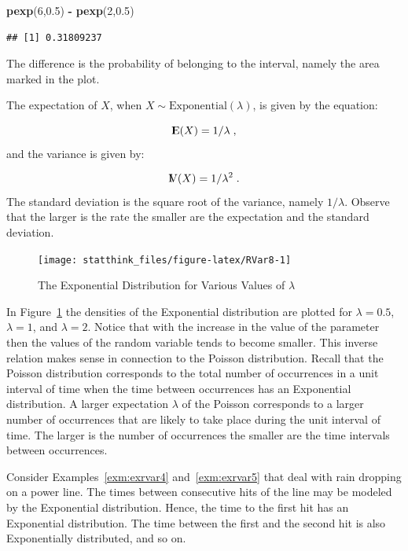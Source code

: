 \documentclass[]{krantz}
\makeatletter
\newenvironment{Shaded}{\begin{snugshade}}{\end{snugshade}}
\newcommand{\DecValTok}[1]{\textcolor[rgb]{0.00,0.00,0.81}{#1}}
\newcommand{\FloatTok}[1]{\textcolor[rgb]{0.00,0.00,0.81}{#1}}
\newcommand{\KeywordTok}[1]{\textcolor[rgb]{0.13,0.29,0.53}{\textbf{#1}}}
\newcommand{\NormalTok}[1]{#1}
\newcommand{\OperatorTok}[1]{\textcolor[rgb]{0.81,0.36,0.00}{\textbf{#1}}}
\newcommand{\StringTok}[1]{\textcolor[rgb]{0.31,0.60,0.02}{#1}}
\newcommand{\Expec}{{\rm I\kern-.3em E}}
\newcommand{\Var}{{\rm I\kern-.3em V}}
\newenvironment{kframe}{%
\medskip{}
\setlength{\fboxsep}{.8em}
 \def\at@end@of@kframe{}%
 \ifinner\ifhmode%
  \def\at@end@of@kframe{\end{minipage}}%
  \begin{minipage}{\columnwidth}%
 \fi\fi%
 \def\FrameCommand##1{\hskip\@totalleftmargin \hskip-\fboxsep
 \colorbox{shadecolor}{##1}\hskip-\fboxsep
     \hskip-\linewidth \hskip-\@totalleftmargin \hskip\columnwidth}%
 \MakeFramed {\advance\hsize-\width
   \@totalleftmargin\z@ \linewidth\hsize
   \@setminipage}}%
 {\par\unskip\endMakeFramed%
 \at@end@of@kframe}
\renewenvironment{Shaded}{\begin{kframe}}{\end{kframe}}
\theoremstyle{definition}
\theoremstyle{definition}
\theoremstyle{definition}
\theoremstyle{remark}
\let\BeginKnitrBlock\begin \let\EndKnitrBlock\end
\makeatother
\begin{document}
\begin{Shaded}
\begin{Highlighting}[]
\KeywordTok{pexp}\NormalTok{(}\DecValTok{6}\NormalTok{,}\FloatTok{0.5}\NormalTok{) }\OperatorTok{-}\StringTok{ }\KeywordTok{pexp}\NormalTok{(}\DecValTok{2}\NormalTok{,}\FloatTok{0.5}\NormalTok{)}
\end{Highlighting}
\end{Shaded}

\begin{verbatim}
## [1] 0.31809237
\end{verbatim}

The difference is the probability of belonging to the interval, namely
the area marked in the plot.

The expectation of \(X\), when \(X \sim \mathrm{Exponential}(\lambda)\), is
given by the equation:

\[\Expec(X) = 1/\lambda\;,\] and the variance is
given by:

\[\Var(X) =1/\lambda^2\;.\] The standard deviation is the
square root of the variance, namely \(1/\lambda\). Observe that the larger
is the rate the smaller are the expectation and the standard deviation.

\begin{figure}

{\centering \texttt{[image: statthink\_files/figure-latex/RVar8-1]} 

}

\caption{The Exponential Distribution for Various Values of $\lambda$}\label{fig:RVar8}
\end{figure}

In Figure~\ref{fig:RVar8} the densities of the Exponential
distribution are plotted for \(\lambda = 0.5\), \(\lambda = 1\), and
\(\lambda = 2\). Notice that with the increase in the value of the
parameter then the values of the random variable tends to become
smaller. This inverse relation makes sense in connection to the Poisson
distribution. Recall that the Poisson distribution corresponds to the
total number of occurrences in a unit interval of time when the time
between occurrences has an Exponential distribution. A larger
expectation \(\lambda\) of the Poisson corresponds to a larger number of
occurrences that are likely to take place during the unit interval of
time. The larger is the number of occurrences the smaller are the time
intervals between occurrences.

\BeginKnitrBlock{example}
\protect\hypertarget{exm:exrvar7}{}{\label{exm:exrvar7} }Consider Examples~\ref{exm:exrvar4}
and~\ref{exm:exrvar5} that deal with rain dropping on a power line.
The times between consecutive hits of the line may be modeled by the
Exponential distribution. Hence, the time to the first hit has an
Exponential distribution. The time between the first and the second hit
is also Exponentially distributed, and so on.
\EndKnitrBlock{example}
\end{document}
